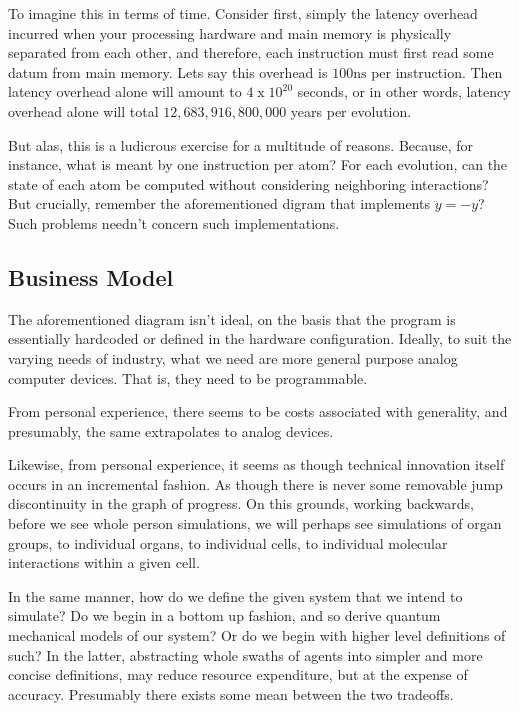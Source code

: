 To imagine this in terms of time. Consider first, simply the latency overhead incurred when your processing hardware and main memory is physically separated from each other, and therefore, each instruction must first read some datum from main memory. Lets say this overhead is $100\mathrm{ns}$ per instruction. Then latency overhead alone will amount to $4\;\mathrm{x}\;10^{20}$ seconds, or in other words, latency overhead alone will total $12,683,916,800,000$ years per evolution.

But alas, this is a ludicrous exercise for a multitude of reasons. Because, for instance, what is meant by one instruction per atom? For each evolution, can the state of each atom be computed without considering neighboring interactions? But crucially, remember the aforementioned digram that implements $\ddot{y} = -y$? Such problems needn't concern such implementations. 

\subsection*{Business Model}

The aforementioned diagram isn't ideal, on the basis that the program is essentially hardcoded or defined in the hardware configuration. Ideally, to suit the varying needs of industry, what we need are more general purpose analog computer devices. That is, they need to be programmable. 

From personal experience, there seems to be costs associated with generality, and presumably, the same extrapolates to analog devices.

Likewise, from personal experience, it seems as though technical innovation itself occurs in an incremental fashion. As though there is never some removable jump discontinuity in the graph of progress. On this grounds, working backwards, before we see whole person simulations, we will perhaps see simulations of organ groups, to individual organs, to individual cells, to individual molecular interactions within a given cell.

In the same manner, how do we define the given system that we intend to simulate? Do we begin in a bottom up fashion, and so derive quantum mechanical models of our system? Or do we begin with higher level definitions of such? In the latter, abstracting whole swaths of agents into simpler and more concise definitions, may reduce resource expenditure, but at the expense of accuracy. Presumably there exists some mean between the two tradeoffs.

